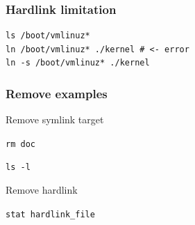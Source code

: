 \begin{frame}[fragile]
	\frametitle{Hardlink limitation}
	\begin{lstlisting}
ls /boot/vmlinuz*
ln /boot/vmlinuz* ./kernel # <- error
ln -s /boot/vmlinuz* ./kernel
\end{lstlisting}
\end{frame}

\begin{frame}[fragile]
	\frametitle{Remove examples}
	Remove symlink target 

	{\tt rm doc} 

	{\tt ls -l}

	Remove hardlink

	\verb|stat hardlink_file|
\end{frame}
